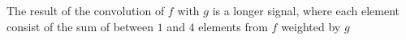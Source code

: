 The result of the convolution of $f$ with $g$ is a longer signal, where each element consist of the sum of between $1$ and $4$ elements from $f$ weighted by $g$